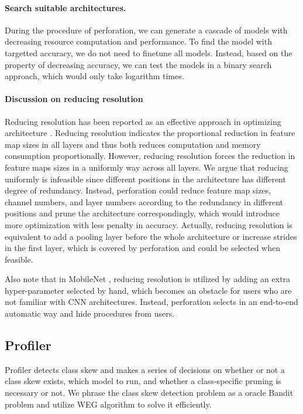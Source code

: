 \documentclass[pageno]{jpaper}
\begin{document}

\paragraph{Search suitable architectures.}
During the procedure of perforation, we can generate a cascade of models with decreasing resource computation and performance. To find the model with targetted accuracy, we do not need to finetune all models. Instead, based on the property of decreasing accuracy, we can test the models in a binary search approach, which would only take logarithm times.

\paragraph{Discussion on reducing resolution}
Reducing resolution has been reported as an effective approach in optimizing architecture \cite{krizhevsky2009learning, fu2017look, howard2017mobilenets}. Reducing resolution indicates the proportional reduction in feature map sizes in all layers and thus both reduces computation and memory consumption proportionally. However, reducing resolution forces the reduction in feature maps sizes in a uniformly way across all layers. We argue that reducing uniformly is infeasible since different positions in the architecture has different degree of redundancy. Instead, perforation could reduce feature map sizes, channel numbers, and layer numbers according to the redundancy in different positions and prune the architecture correspondingly, which would introduce more optimization with less penalty in accuracy. Actually, reducing resolution is equivalent to add a pooling layer before the whole architecture or increase strides in the first layer, which is covered by perforation and could be selected when feasible.

Also note that in MobileNet \cite{howard2017mobilenets}, reducing resolution is utilized by adding an extra hyper-parameter selected by hand, which becomes an obstacle for users who are not familiar with CNN architectures. Instead, perforation selects in an end-to-end automatic way and hide procedures from users.



\subsection{Profiler} \label{profilerSection}
Profiler detects class skew and makes a series of decisions on whether or not a class skew exists, which model to run, and whether a class-specific pruning is necessary or not. We phrase the class skew detection problem as a oracle Bandit problem \cite{auer2002finite, lai1985asymptotically} and utilize WEG algorithm \cite{shen2016fast} to solve it efficiently.
\end{document}

